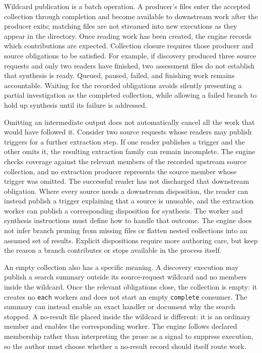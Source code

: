 \documentclass[letterpaper]{article}
\theoremstyle{definition}
\begin{document}
Wildcard publication is a batch operation. A producer's files enter the
accepted collection through completion and become available to downstream
work after the producer exits; matching files are not streamed into new
executions as they appear in the directory. Once reading work has been
created, the engine records which contributions are expected. Collection
closure requires those producer and source obligations to be satisfied.
For example, if discovery produced three source requests and only two
readers have finished, two assessment files do not establish that synthesis
is ready. Queued, paused, failed, and finishing work remains accountable.
Waiting for the recorded obligations avoids silently presenting a partial
investigation as the completed collection, while allowing a failed branch
to hold up synthesis until its failure is addressed.

Omitting an intermediate output does not automatically cancel all the work
that would have followed it. Consider two source requests whose readers
may publish triggers for a further extraction step. If one reader publishes
a trigger and the other omits it, the resulting extraction family can remain
incomplete. The engine checks coverage against the relevant members of the
recorded upstream source collection, and no extraction producer represents the source member whose
trigger was omitted. The successful reader has not discharged that downstream
obligation. Where every source needs a downstream disposition, the reader
can instead publish a trigger explaining that a source is unusable, and the
extraction worker can publish a corresponding disposition for synthesis.
The worker and synthesis instructions must define how to handle that outcome.
The engine does not infer branch pruning from missing files or flatten
nested collections into an assumed set of results. Explicit dispositions
require more authoring care, but keep the reason a branch contributes or
stops available in the process itself.

An empty collection also has a specific meaning. A discovery execution may
publish a search summary outside its source-request wildcard and no members
inside the wildcard. Once the relevant obligations close, the collection
is empty: it creates no \texttt{each} workers and does not start an empty
\texttt{complete} consumer. The summary can instead enable an exact handler
or document why the search stopped. A no-result file placed inside the
wildcard is different: it is an ordinary member and enables the corresponding
worker. The engine follows declared membership rather than interpreting
the prose as a signal to suppress execution, so the author must choose
whether a no-result record should itself route work.
\end{document}
